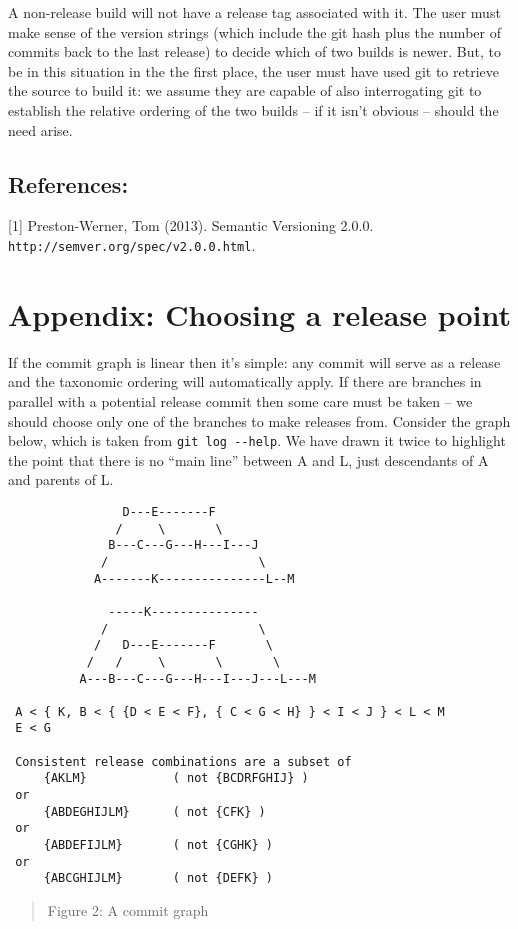 \documentclass[11pt]{article}
\begin{document}
A non-release build will not have a release tag associated with it. The user
must make sense of the version strings (which include the git hash plus the
number of commits back to the last release) to decide which of two builds
is newer. But, to be in this situation in the the first place, the user must
have used git to retrieve the source to build it: we assume they are capable
of also interrogating git to establish the relative ordering of the two
builds -- if it isn't obvious -- should the need arise.

\subsection*{References:}

[1] Preston-Werner, Tom (2013). Semantic Versioning 2.0.0.\\
    \verb|http://semver.org/spec/v2.0.0.html|.

\newpage
\section*{Appendix: Choosing a release point}

If the commit graph is linear then it's simple: any commit will serve as a
release and the taxonomic ordering will automatically apply. If there are
branches in parallel with a potential release commit then some care must be
taken -- we should choose only one of the branches to make releases
from. Consider the graph below, which is taken from \verb|git log --help|.
We have drawn it twice to highlight the point that there is no ``main line''
between A and L, just descendants of A and parents of L.

\begin{verbatim}
                D---E-------F
               /     \       \
              B---C---G---H---I---J
             /                     \
            A-------K---------------L--M

              -----K---------------
             /                     \
            /   D---E-------F       \
           /   /     \       \       \
          A---B---C---G---H---I---J---L---M

 A < { K, B < { {D < E < F}, { C < G < H} } < I < J } < L < M
 E < G                     

 Consistent release combinations are a subset of
     {AKLM}            ( not {BCDRFGHIJ} )
 or
     {ABDEGHIJLM}      ( not {CFK} )
 or
     {ABDEFIJLM}       ( not {CGHK} )
 or
     {ABCGHIJLM}       ( not {DEFK} )
\end{verbatim}
\begin{quote}
  Figure 2: A commit graph
\end{quote}
\end{document}
